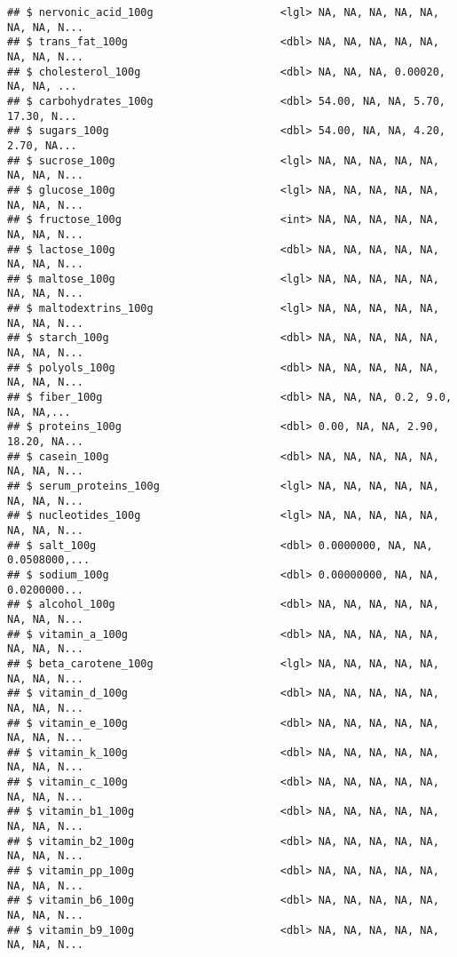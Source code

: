 \documentclass[]{article}
\begin{document}
\begin{verbatim}
## $ nervonic_acid_100g                    <lgl> NA, NA, NA, NA, NA, NA, NA, N...
## $ trans_fat_100g                        <dbl> NA, NA, NA, NA, NA, NA, NA, N...
## $ cholesterol_100g                      <dbl> NA, NA, NA, 0.00020, NA, NA, ...
## $ carbohydrates_100g                    <dbl> 54.00, NA, NA, 5.70, 17.30, N...
## $ sugars_100g                           <dbl> 54.00, NA, NA, 4.20, 2.70, NA...
## $ sucrose_100g                          <lgl> NA, NA, NA, NA, NA, NA, NA, N...
## $ glucose_100g                          <lgl> NA, NA, NA, NA, NA, NA, NA, N...
## $ fructose_100g                         <int> NA, NA, NA, NA, NA, NA, NA, N...
## $ lactose_100g                          <dbl> NA, NA, NA, NA, NA, NA, NA, N...
## $ maltose_100g                          <lgl> NA, NA, NA, NA, NA, NA, NA, N...
## $ maltodextrins_100g                    <lgl> NA, NA, NA, NA, NA, NA, NA, N...
## $ starch_100g                           <dbl> NA, NA, NA, NA, NA, NA, NA, N...
## $ polyols_100g                          <dbl> NA, NA, NA, NA, NA, NA, NA, N...
## $ fiber_100g                            <dbl> NA, NA, NA, 0.2, 9.0, NA, NA,...
## $ proteins_100g                         <dbl> 0.00, NA, NA, 2.90, 18.20, NA...
## $ casein_100g                           <dbl> NA, NA, NA, NA, NA, NA, NA, N...
## $ serum_proteins_100g                   <lgl> NA, NA, NA, NA, NA, NA, NA, N...
## $ nucleotides_100g                      <lgl> NA, NA, NA, NA, NA, NA, NA, N...
## $ salt_100g                             <dbl> 0.0000000, NA, NA, 0.0508000,...
## $ sodium_100g                           <dbl> 0.00000000, NA, NA, 0.0200000...
## $ alcohol_100g                          <dbl> NA, NA, NA, NA, NA, NA, NA, N...
## $ vitamin_a_100g                        <dbl> NA, NA, NA, NA, NA, NA, NA, N...
## $ beta_carotene_100g                    <lgl> NA, NA, NA, NA, NA, NA, NA, N...
## $ vitamin_d_100g                        <dbl> NA, NA, NA, NA, NA, NA, NA, N...
## $ vitamin_e_100g                        <dbl> NA, NA, NA, NA, NA, NA, NA, N...
## $ vitamin_k_100g                        <dbl> NA, NA, NA, NA, NA, NA, NA, N...
## $ vitamin_c_100g                        <dbl> NA, NA, NA, NA, NA, NA, NA, N...
## $ vitamin_b1_100g                       <dbl> NA, NA, NA, NA, NA, NA, NA, N...
## $ vitamin_b2_100g                       <dbl> NA, NA, NA, NA, NA, NA, NA, N...
## $ vitamin_pp_100g                       <dbl> NA, NA, NA, NA, NA, NA, NA, N...
## $ vitamin_b6_100g                       <dbl> NA, NA, NA, NA, NA, NA, NA, N...
## $ vitamin_b9_100g                       <dbl> NA, NA, NA, NA, NA, NA, NA, N...

\end{verbatim}
\end{document}
